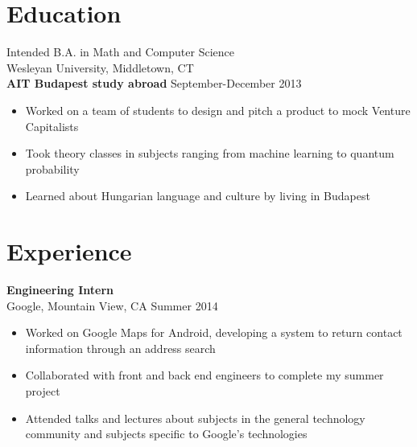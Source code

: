 \documentclass[margin, 9pt]{res}
\begin{document}

\address{{\bf School Address} \\ WesBox 90572 \\ 45 Wyllys Ave. \\ Middletown, CT 06459}

\address{{\bf Home Address} \\ 7 Tallowood Ct. \\ Greensboro, NC 27455 \\ (336) 312-0456}

\begin{resume}

\section{Education}
Intended B.A. in Math and Computer Science\\
Wesleyan University, Middletown, CT \\

{\bf AIT Budapest study abroad} \hfill September-December 2013
\begin{itemize} \itemsep -2pt
  \item Worked on a team of students to design and pitch a product to mock Venture Capitalists
  \item Took theory classes in subjects ranging from machine learning to quantum probability
  \item Learned about Hungarian language and culture by living in Budapest
\end{itemize}

\section{Experience}

{\bf Engineering Intern } \\ Google, Mountain View, CA \hfill Summer 2014
\begin{itemize} \itemsep -2pt
  \item Worked on Google Maps for Android, developing a system to return contact information through an address search
  \item Collaborated with front and back end engineers to complete my summer project
  \item Attended talks and lectures about subjects in the general technology community and subjects specific to Google's technologies
\end{itemize}


\end{resume}
\end{document}
